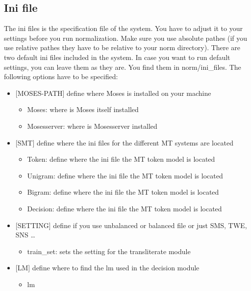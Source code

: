 \documentclass[letterpaper,10pt,english]{sphinxmanual}
\begin{document}
\subsection{Ini file}
\label{\detokenize{README:ini-file}}
The ini files is the specification file of the system. You have to adjust it to your settings before you run normalization. Make sure you use absolute pathes (if you use relative pathes they have to be relative to your norm directory). There are two default ini files included in the system. In case you want to run default settings, you can leave them as they are. You find them in norm/ini\_files. The following options have to be specified:
\begin{itemize}
\item {} 
{[}MOSES-PATH{]} define where Moses is installed on your machine
\begin{itemize}
\item {} 
Moses: where is Moses itself installed

\item {} 
Mosesserver: where is Mosesserver installed

\end{itemize}

\item {} 
{[}SMT{]} define where the ini files for the different MT systems are located
\begin{itemize}
\item {} 
Token:  define where the ini file the MT token model is located

\item {} 
Unigram: define where the ini file the MT token model is located

\item {} 
Bigram: define where the ini file the MT token model is located

\item {} 
Decision: define where the ini file the MT token model is located

\end{itemize}

\item {} 
{[}SETTING{]} define if you use unbalanced or balanced file or just SMS, TWE, SNS …
\begin{itemize}
\item {} 
train\_set: sets the setting for the transliterate module

\end{itemize}

\item {} 
{[}LM{]} define where to find the lm used in the decision module
\begin{itemize}
\item {} 
lm


\end{itemize}
\end{itemize}
\end{document}
